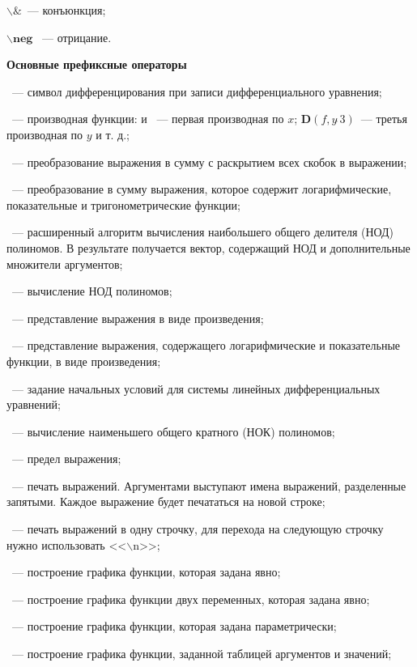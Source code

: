  $\mathbf{ \backslash  \&}$~--- конъюнкция;

 $\mathbf{ \backslash neg}$ ~--- отрицание. 


{\bf Основные префиксные операторы}

 ~--- символ дифференцирования при записи дифференциального уравнения;

 ~--- производная функции:  и ~--- первая производная по $x$; $\mathbf D (f, y\widehat{\ }{}3)$~--- третья производная по $y$ и т. д.;

 ~--- преобразование выражения в сумму с раскрытием всех скобок в выражении;

 ~--- преобразование в сумму выражения, которое содержит логарифмические, показательные и тригонометрические функции;

 ~--- расширенный алгоритм вычисления наибольшего общего делителя (НОД) полиномов.  В результате получается вектор,  содержащий НОД и дополнительные множители аргументов;

 ~--- вычисление НОД полиномов;

 ~--- представление выражения в виде произведения;

 ~--- представление выражения,  содержащего логарифмические и показательные функции,  в виде произведения;

 ~--- задание начальных условий для системы линейных дифференциальных уравнений;

 ~--- вычисление наименьшего общего кратного (НОК) полиномов;

 ~--- предел выражения;

 ~--- печать выражений. Аргументами выступают имена выражений, разделенные запятыми. Каждое выражение будет печататься на новой строке;

 ~--- печать выражений в одну строчку, для перехода на следующую строчку нужно использовать <<$\backslash$n>>;

 ~--- построение графика функции, которая задана явно;
 
  ~--- построение графика функции двух переменных, которая задана явно;

 ~--- построение графика функции, которая задана  параметрически; 

~--- построение графика функции,  заданной таблицей аргументов и значений;

